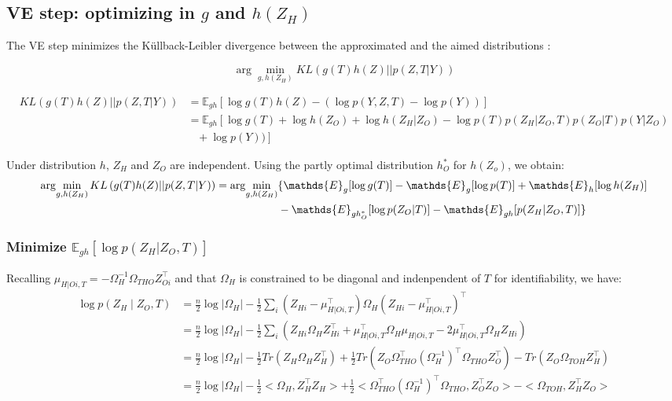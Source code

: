 \documentclass[11pt,a4paper]{article}
\newcommand{\argmin}{\arg\!\min}
\newcommand{\Esp}{\mathds{E}}
\begin{document}
\subsection{VE step: optimizing in $g$ and $h(Z_H)$}
The VE step minimizes the Küllback-Leibler divergence between the approximated and the aimed distributions :

$$  \argmin_{g,h(Z_H)} KL\left(g(T)h(Z) || p(Z,T|Y)\right)$$


\begin{align*}
KL\left(g(T)h(Z) || p(Z,T|Y)\right) &= \Esp_{gh}\left[\log g(T)h(Z) - (\log p(Y,Z,T) - \log p(Y) ) \right]\\
&=\Esp_{gh}\left[\log g(T) + \log h(Z_O)+ \log h(Z_H|Z_O) - \log p(T)p(Z_H|Z_O,T)p(Z_O|T)p(Y|Z_O)\right. \\
& \;\;\;+ \log p(Y) )\left. \right]
\end{align*}

Under distribution $h$, $Z_H$ and $Z_O$ are independent. Using the partly optimal distribution $h_O^*$ for $h(Z_o)$, we obtain:
\begin{align*}
\argmin_{g,h(Z_H)} KL\left(g(T)h(Z) || p(Z,T|Y)\right) &=\argmin_{g,h(Z_H)} \{ \Esp_g[\log g(T)] - \Esp_g[\log p(T)] + \Esp_h[\log h(Z_H)]  \\
& \text{\hspace{2cm}}   - \Esp_{gh_O^*}[\log p(Z_O|T)] - \Esp_{gh}[ p(Z_H|Z_O,T)]  \}\\
\end{align*}

\subsubsection{Minimize  $\Esp_{gh}[\log p(Z_H | Z_O,T) ]$}
Recalling $\mu_{H|Oi,T} = -\Omega_H^{-1}\Omega_{THO}Z_{Oi} ^\intercal $ and that $\Omega_H$ is constrained to be diagonal and indenpendent of $T$ for identifiability, we have:
\begin{align*}
\log p(Z_H\mid Z_O,T) &= \frac{n}{2} \log |\Omega_H| -\frac{1}{2} \sum_i (Z_{Hi}-\mu_{H|Oi,T}^\intercal )\Omega_H(Z_{Hi}-\mu_{H|Oi,T}^\intercal )^\intercal \\
&= \frac{n}{2} \log |\Omega_H| -\frac{1}{2} \sum_i \left(Z_{Hi}\Omega_HZ_{Hi}^\intercal  + \mu_{H|Oi,T}^\intercal \Omega_H\mu_{H|Oi,T} - 2\mu_{H|Oi,T}^\intercal \Omega_HZ_{Hi} \right)\\
&= \frac{n}{2} \log |\Omega_H| -\frac{1}{2}Tr(Z_H\Omega_HZ_H^\intercal ) + \frac{1}{2} Tr(Z_O\Omega_{THO}^\intercal (\Omega_H^{-1})^\intercal \Omega_{THO}Z_O^\intercal ) - Tr(Z_O\Omega_{TOH}Z_H^\intercal)\\
&=\frac{n}{2} \log |\Omega_H| -\frac{1}{2}<\Omega_H,Z_H^\intercal Z_H> + \frac{1}{2} <\Omega_{THO}^\intercal (\Omega_H^{-1})^\intercal \Omega_{THO},Z_O^\intercal Z_O>- <\Omega_{TOH},Z_H^\intercal Z_O>
\end{align*}
\end{document}
